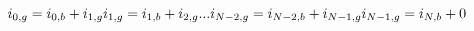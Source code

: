 \documentclass[10pt]{article}
\begin{document}
\[\hspace{-15pt}i_{0,g}= i_{0,b} + i_{1,g} \\
i_{1,g} = i_{1,b} + i_{2,g} \\
...\\
i_{N-2,g} = i_{N-2,b} + i_{N-1,g} \\
i_{N-1,g} = i_{N,b} + 0 \\
\]
\end{document}
